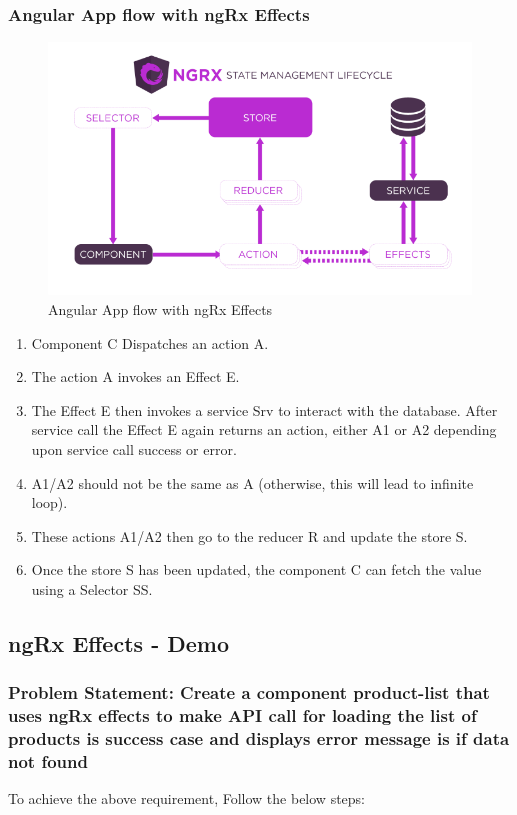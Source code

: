 \documentclass{report}
\begin{document}
\subsubsection*{Angular App flow with ngRx Effects} 
\begin{figure}[h]
	\centerline{\includegraphics{ngrxflowdiagram.png}}
	\caption{Angular App flow with ngRx Effects}
	\label{Angular App flow with ngRx Effects}
\end{figure}

\begin{enumerate}
	\item{Component C Dispatches an action A.}
	\item{The action A invokes an Effect E.}
	\item{The Effect E then invokes a service Srv to interact with the database. After service call the Effect E again returns an action, either A1 or A2 depending upon service call success or error.}
	\item{A1/A2 should not be the same as A (otherwise, this will lead to infinite loop).}
	\item{These actions A1/A2 then go to the reducer R and update the store S.}
	\item{Once the store S has been updated, the component C can fetch the value using a Selector SS.}
\end{enumerate}

\subsection{ngRx Effects - Demo}
\subsubsection*{Problem Statement: Create a component product-list that uses ngRx effects to make API call for loading the list of products is success case and displays error message is if data not found}
To achieve the above requirement, Follow the below steps:
\end{document}
